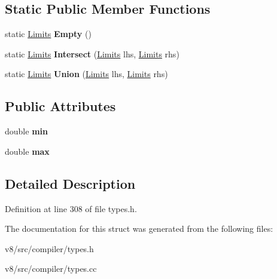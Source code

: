 \subsection*{Static Public Member Functions}
\begin{DoxyCompactItemize}
\item 
\mbox{\label{structv8_1_1internal_1_1compiler_1_1RangeType_1_1Limits_afbef44ef2a2870d19e3e00fd5b1c6aa2}} 
static \mbox{\hyperlink{structv8_1_1internal_1_1compiler_1_1RangeType_1_1Limits}{Limits}} {\bfseries Empty} ()
\item 
\mbox{\label{structv8_1_1internal_1_1compiler_1_1RangeType_1_1Limits_af06043c0f72eb8e21c855b2b0fe4ee27}} 
static \mbox{\hyperlink{structv8_1_1internal_1_1compiler_1_1RangeType_1_1Limits}{Limits}} {\bfseries Intersect} (\mbox{\hyperlink{structv8_1_1internal_1_1compiler_1_1RangeType_1_1Limits}{Limits}} lhs, \mbox{\hyperlink{structv8_1_1internal_1_1compiler_1_1RangeType_1_1Limits}{Limits}} rhs)
\item 
\mbox{\label{structv8_1_1internal_1_1compiler_1_1RangeType_1_1Limits_a80d3858aa790537ef35e05ce262c2bf7}} 
static \mbox{\hyperlink{structv8_1_1internal_1_1compiler_1_1RangeType_1_1Limits}{Limits}} {\bfseries Union} (\mbox{\hyperlink{structv8_1_1internal_1_1compiler_1_1RangeType_1_1Limits}{Limits}} lhs, \mbox{\hyperlink{structv8_1_1internal_1_1compiler_1_1RangeType_1_1Limits}{Limits}} rhs)
\end{DoxyCompactItemize}
\subsection*{Public Attributes}
\begin{DoxyCompactItemize}
\item 
\mbox{\label{structv8_1_1internal_1_1compiler_1_1RangeType_1_1Limits_a520613bd932156ed3aad6d25b74919a3}} 
double {\bfseries min}
\item 
\mbox{\label{structv8_1_1internal_1_1compiler_1_1RangeType_1_1Limits_ab5a072a21ebd3123c13cedc421bcd4a5}} 
double {\bfseries max}
\end{DoxyCompactItemize}


\subsection{Detailed Description}


Definition at line 308 of file types.\+h.



The documentation for this struct was generated from the following files\+:\begin{DoxyCompactItemize}
\item 
v8/src/compiler/types.\+h\item 
v8/src/compiler/types.\+cc\end{DoxyCompactItemize}
